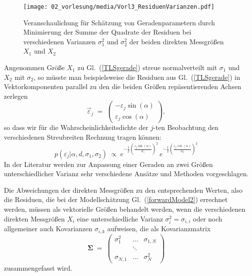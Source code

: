 \begin{figure}
\begin{center}
\texttt{[image: 02\_vorlesung/media/Vorl3\_ResiduenVarianzen.pdf]}
\end{center}
\caption{Veranschaulichung für Schätzung von Geradenparametern durch
Minimierung der Summe der Quadrate der Residuen bei verschiedenen Varianzen 
$\sigma_1^2$ und $\sigma_2^2$ der beiden direkten Messgrößen $X_1$ und $X_2$
\label{ResiduenVarianzen}}
\end{figure}
Angenommen Größe $X_1$ zu Gl.~(\ref{TLSgerade}) streue normalverteilt mit $\sigma_1$ und
$X_2$ mit $\sigma_2$, so müsste man beispielsweise die Residuen aus Gl.~(\ref{TLSgerade}) in
Vektorkomponenten parallel zu den die beiden Größen repäsentierenden Achsen zerlegen
\begin{equation}
\vec \varepsilon_j \; = \;
\left(\begin{array}{c}
-\varepsilon_j \sin(\alpha)\\
\varepsilon_j \cos(\alpha)
\end{array}\right) ,
\end{equation}
so dass wir für die Wahrscheinlichkeitsdichte
der $j$-ten Beobachtung den verschiedenen Streubreiten Rechnung tragen können:
\begin{equation}
p(\varepsilon_j | \alpha, d, \sigma_1, \sigma_2) \; \propto \; 
e^{-\frac{1}{2} \left(\frac{\varepsilon_j \sin(\alpha)}{\sigma_1}\right)^2}
\, e^{-\frac{1}{2} \left(\frac{\varepsilon_j \cos(\alpha)}{\sigma_2}\right)^2}
\end{equation}
In der Literatur werden zur Anpassung einer Geraden an zwei Größen
unterschiedlicher Varianz sehr verschiedene Ansätze und Methoden vorgeschlagen.

Die Abweichungen der direkten Messgrößen zu den entsprechenden Werten, also die Residuen,
die bei der Modellschätzung Gl.~(\ref{forwardModel2}) errechnet werden, müssen als
vektorielle Größen behandelt werden, wenn die verschiedenen direkten Messgrößen $X_i$ eine
unterschiedliche Varianz $\sigma_i^2 = \sigma_{i,i}$ oder noch allgemeiner auch
Kovarianzen $\sigma_{i,k}$ aufweisen, die als Kovarianzmatrix
\begin{equation}
\boldsymbol{\Sigma} \; = \;
\left(\begin{array}{ccc}
\sigma_1^2 & \dots & \sigma_{1,N}\\
 & \ddots & \\
\sigma_{N,1} & \dots & \sigma_N^2
\end{array}\right)
\end{equation}
zusammengefasst wird.

